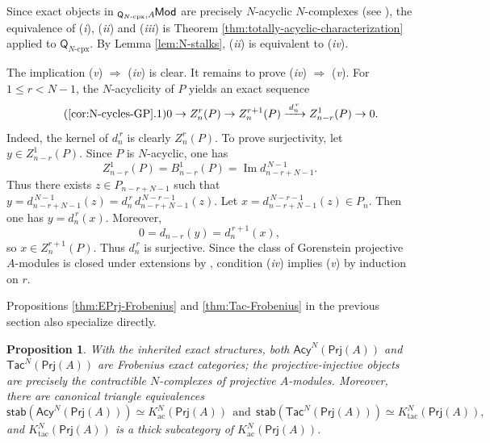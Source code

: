 \documentclass{amsart}
\theoremstyle{bfupright head,slanted body}
\theoremstyle{bfupright head,upright body}
\theoremstyle{fixed bf head,slanted body}
\newtheorem{prp}[res]{Proposition}      \newtheorem*{prp*}{Proposition}
\theoremstyle{fixed bf head,upright body}
\theoremstyle{numbered paragraph}
\newcounter{eqc}
\newenvironment{prf*}[1][Proof]{%
	\begin{proof}[\bf #1]
		\setcounter{equation}{0}
		\renewcommand{\theequation}{\arabic{equation}}}
	{\end{proof}
}
\newcommand{\eqclbl}[1]{{\upshape(\textit{#1})}}
\numberwithin{equation}{res}
\newcommand{\Prj}[1]{\mathsf{Prj}(#1)}
\newcommand{\xra}[2][]{\xrightarrow[#1]{\:#2\:}}
\newcommand{\Q}{\mathsf{Q}}
\newcommand{\lMod}[1]{{}_{#1}\mspace{-1mu}{\sf{Mod}}}
\begin{document}
\begin{prf*}
Since exact objects in $\lMod{\Q_{N\text{-}\mathrm{cpx}},A}$ are precisely $N$-acyclic $N$-complexes (see \cite[3.5]{HJ24b}), the equivalence of \eqclbl{i}, \eqclbl{ii} and \eqclbl{iii} is Theorem \ref{thm:totally-acyclic-characterization} applied to $\Q_{N\text{-}\mathrm{cpx}}$. By Lemma \ref{lem:N-stalks}, \eqclbl{ii} is equivalent to \eqclbl{iv}.

The implication \eqclbl{v} $\Rightarrow$ \eqclbl{iv} is clear. It remains to prove \eqclbl{iv} $\Rightarrow$ \eqclbl{v}. For $1\leq r<N-1$, the $N$-acyclicity of $P$ yields an exact sequence
\begin{equation}\tag{\ref{cor:N-cycles-GP}.1}\label{4.4.1}
0\to Z_n^r(P)\to Z_n^{r+1}(P)\xra{d_n^{\,r}}
Z_{n-r}^1(P)\to 0.
\end{equation}
Indeed, the kernel of $d_n^{\,r}$ is clearly $Z_n^r(P)$. To prove surjectivity, let $y\in Z_{n-r}^1(P)$. Since $P$ is $N$-acyclic, one has $$Z_{n-r}^1(P)=B_{n-r}^1(P)=\operatorname{Im}d_{n-r+N-1}^{\,N-1}.$$
Thus there exists $z\in P_{n-r+N-1}$ such that $y=d_{n-r+N-1}^{\,N-1}(z)=d_n^{\,r}\,d_{n-r+N-1}^{\,N-r-1}(z)$. Let $x=d_{n-r+N-1}^{\,N-r-1}(z)\in P_n$. Then one has $y=d_n^{\,r}(x)$. Moreover,
$$0=d_{n-r}(y)=d_n^{\,r+1}(x),$$
so $x\in Z_n^{r+1}(P)$. Thus $d_n^{\,r}$ is surjective. Since the class of Gorenstein projective $A$-modules is closed under extensions by \cite[Theorem 2.5]{HHl04a}, condition \eqclbl{iv} implies \eqclbl{v} by induction on $r$.
\end{prf*}

Propositions \ref{thm:EPrj-Frobenius} and \ref{thm:Tac-Frobenius} in the previous section also specialize directly.

\begin{prp}\label{cor:N-Frobenius}
With the inherited exact structures, both $\mathsf{Acy}^N(\Prj A)$ and $\mathsf{Tac}^N(\Prj A)$ are Frobenius exact categories; the projective-injective objects are precisely the contractible $N$-complexes of projective $A$-modules. Moreover, there are canonical triangle equivalences
$$\mathsf{stab}(\mathsf{Acy}^N(\Prj A))
\simeq K^N_{\mathrm{ac}}(\Prj A)
\ \ \text{and}\ \
\mathsf{stab}(\mathsf{Tac}^N(\Prj A))
\simeq K^N_{\mathrm{tac}}(\Prj A),$$
and $K^N_{\mathrm{tac}}(\Prj A)$ is a thick subcategory of $K^N_{\mathrm{ac}}(\Prj A)$.
\end{prp}
\end{document}
